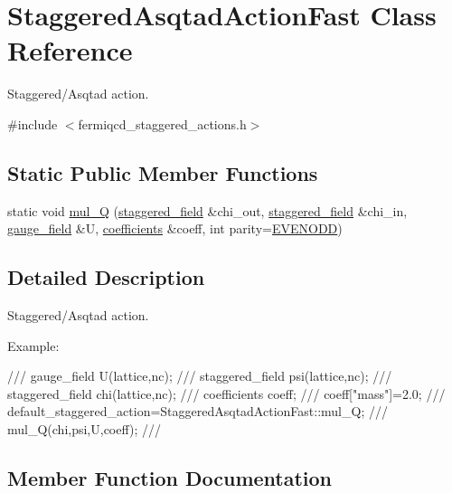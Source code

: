 \hypertarget{class_staggered_asqtad_action_fast}{}\section{Staggered\+Asqtad\+Action\+Fast Class Reference}
\label{class_staggered_asqtad_action_fast}


Staggered/\+Asqtad action.  




{\ttfamily \#include $<$fermiqcd\+\_\+staggered\+\_\+actions.\+h$>$}

\subsection*{Static Public Member Functions}
\begin{DoxyCompactItemize}
\item 
static void \hyperlink{class_staggered_asqtad_action_fast_a0935fc01782fc453823fbabfe24aa2be}{mul\+\_\+Q} (\hyperlink{classstaggered__field}{staggered\+\_\+field} \&chi\+\_\+out, \hyperlink{classstaggered__field}{staggered\+\_\+field} \&chi\+\_\+in, \hyperlink{classgauge__field}{gauge\+\_\+field} \&U, \hyperlink{classcoefficients}{coefficients} \&coeff, int parity=\hyperlink{mdp__global__vars_8h_a4c9de81f2de5a74b588107b6c0afb9ee}{E\+V\+E\+N\+O\+DD})
\end{DoxyCompactItemize}


\subsection{Detailed Description}
Staggered/\+Asqtad action. 

Example\+: \begin{DoxyVerb}/// gauge_field U(lattice,nc);
/// staggered_field psi(lattice,nc);
/// staggered_field chi(lattice,nc);
/// coefficients coeff;
/// coeff["mass"]=2.0;
/// default_staggered_action=StaggeredAsqtadActionFast::mul_Q;
/// mul_Q(chi,psi,U,coeff);
/// \end{DoxyVerb}
 

\subsection{Member Function Documentation}
\mbox{\label{class_staggered_asqtad_action_fast_a0935fc01782fc453823fbabfe24aa2be}} 
